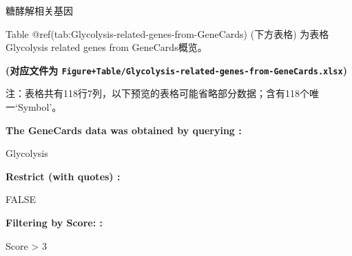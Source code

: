 \documentclass[
  ignorenonframetext,
]{beamer}
\begin{document}
\begin{frame}[fragile]{糖酵解相关基因}
\protect\hypertarget{ux7cd6ux9175ux89e3ux76f8ux5173ux57faux56e0}{}
\begin{center}\vspace{1.5cm}\end{center}

Table @ref(tab:Glycolysis-related-genes-from-GeneCards) (下方表格)
为表格Glycolysis related genes from GeneCards概览。

\textbf{(对应文件为
\texttt{Figure+Table/Glycolysis-related-genes-from-GeneCards.xlsx})}

\begin{center}\begin{tcolorbox}[colback=gray!10, colframe=gray!50, width=0.9\linewidth, arc=1mm, boxrule=0.5pt]注：表格共有118行7列，以下预览的表格可能省略部分数据；含有118个唯一`Symbol'。
\end{tcolorbox}
\end{center}\begin{center}\begin{tcolorbox}[colback=gray!10, colframe=gray!50, width=0.9\linewidth, arc=1mm, boxrule=0.5pt]
\textbf{
The GeneCards data was obtained by querying
:}

\vspace{0.5em}

    Glycolysis

\vspace{2em}


\textbf{
Restrict (with quotes)
:}

\vspace{0.5em}

    FALSE

\vspace{2em}


\textbf{
Filtering by Score:
:}

\vspace{0.5em}

    Score > 3

\vspace{2em}
\end{tcolorbox}
\end{center}


\end{frame}
\end{document}
